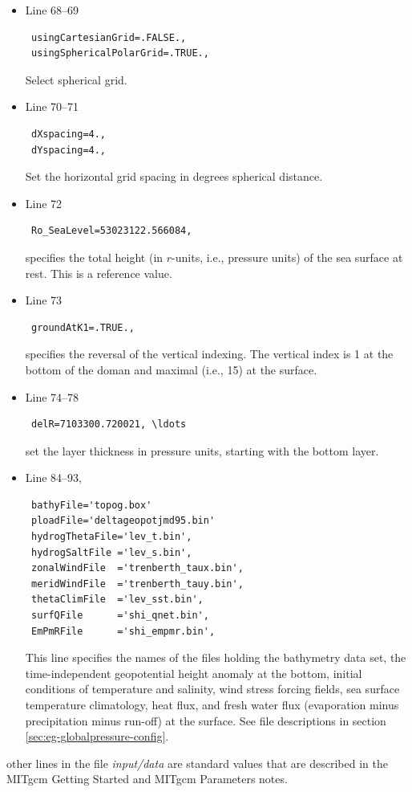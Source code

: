 {\begin{itemize}
\item Line 68--69
\begin{verbatim}
 usingCartesianGrid=.FALSE.,
 usingSphericalPolarGrid=.TRUE.,
\end{verbatim}
  Select spherical grid.
\item Line 70--71
\begin{verbatim}
 dXspacing=4.,
 dYspacing=4.,
\end{verbatim}
Set the horizontal grid spacing in degrees spherical distance.
\item Line 72
\begin{verbatim}
 Ro_SeaLevel=53023122.566084,
\end{verbatim}
specifies the total height (in $r$-units, i.e., pressure units) of the
sea surface at rest. This is a reference value.
\item Line 73
\begin{verbatim}
 groundAtK1=.TRUE.,
\end{verbatim}
specifies the reversal of the vertical indexing. The vertical index is 
1 at the bottom of the doman and maximal (i.e., 15) at the surface.
\item Line 74--78
\begin{verbatim}
 delR=7103300.720021, \ldots 
\end{verbatim}
  set the layer thickness in pressure units, starting with the bottom
  layer.

\item Line 84--93,
\begin{verbatim}
 bathyFile='topog.box'
 ploadFile='deltageopotjmd95.bin'
 hydrogThetaFile='lev_t.bin',
 hydrogSaltFile ='lev_s.bin',
 zonalWindFile  ='trenberth_taux.bin',
 meridWindFile  ='trenberth_tauy.bin',
 thetaClimFile  ='lev_sst.bin',
 surfQFile      ='shi_qnet.bin',
 EmPmRFile      ='shi_empmr.bin',
\end{verbatim}
  This line specifies the names of the files holding the bathymetry
  data set, the
  time-independent geopotential height anomaly at the bottom, initial
  conditions of temperature and salinity, wind stress forcing fields,
  sea surface temperature climatology, heat flux, and fresh water flux
  (evaporation minus precipitation minus run-off) at the surface. 
  See file descriptions in section \ref{sec:eg-globalpressure-config}.

\end{itemize}

\noindent other lines in the file {\it input/data} are standard values
that are described in the MITgcm Getting Started and MITgcm Parameters
notes.

}
